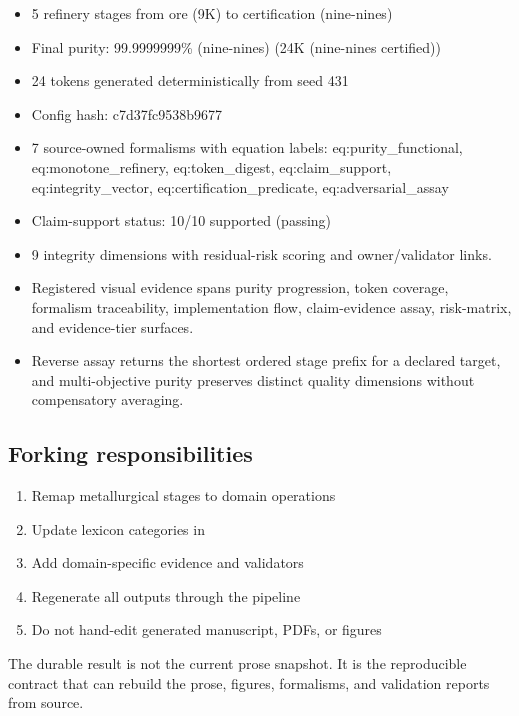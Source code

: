 \documentclass[
  english,
]{article}
\providecommand{\tightlist}{%
  \setlength{\itemsep}{0pt}\setlength{\parskip}{0pt}}
\begin{document}
\begin{itemize}
\tightlist
\item
  5 refinery stages from ore (9K) to certification (nine-nines)
\item
  Final purity: 99.9999999\% (nine-nines) (24K (nine-nines certified))
\item
  24 tokens generated deterministically from seed 431
\item
  Config hash: c7d37fc9538b9677
\item
  7 source-owned formalisms with equation labels: eq:purity\_functional,
  eq:monotone\_refinery, eq:token\_digest, eq:claim\_support,
  eq:integrity\_vector, eq:certification\_predicate,
  eq:adversarial\_assay
\item
  Claim-support status: 10/10 supported (passing)
\item
  9 integrity dimensions with residual-risk scoring and owner/validator
  links.
\item
  Registered visual evidence spans purity progression, token coverage,
  formalism traceability, implementation flow, claim-evidence assay,
  risk-matrix, and evidence-tier surfaces.
\item
  Reverse assay returns the shortest ordered stage prefix for a declared
  target, and multi-objective purity preserves distinct quality
  dimensions without compensatory averaging.
\end{itemize}

\subsection{Forking responsibilities}\label{forking-responsibilities}

\begin{enumerate}
\def\labelenumi{\arabic{enumi}.}
\tightlist
\item
  Remap metallurgical stages to domain operations
\item
  Update lexicon categories in 
\item
  Add domain-specific evidence and validators
\item
  Regenerate all outputs through the pipeline
\item
  Do not hand-edit generated manuscript, PDFs, or figures
\end{enumerate}

The durable result is not the current prose snapshot. It is the
reproducible contract that can rebuild the prose, figures, formalisms,
and validation reports from source.
\end{document}
